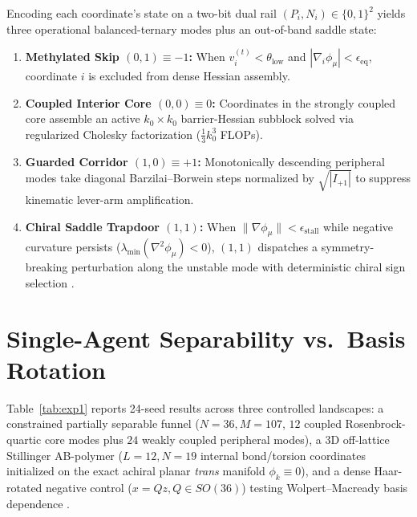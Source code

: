 \documentclass[10pt,twocolumn,letterpaper]{article}
\begin{document}
Encoding each coordinate's state on a two-bit dual rail $(P_i, N_i) \in \{0,1\}^2$ yields three operational balanced-ternary modes plus an out-of-band saddle state:
\begin{enumerate}\setlength{\itemsep}{1pt}\setlength{\parskip}{0pt}
  \item \textbf{Methylated Skip $(0,1) \equiv -1$:} When $v_i^{(t)} < \theta_{\text{low}}$ and $|\nabla_i \phi_\mu| < \epsilon_{\text{eq}}$, coordinate $i$ is excluded from dense Hessian assembly.
  \item \textbf{Coupled Interior Core $(0,0) \equiv 0$:} Coordinates in the strongly coupled core assemble an active $k_0 \times k_0$ barrier-Hessian subblock solved via regularized Cholesky factorization ($\frac{1}{3}k_0^3$ FLOPs).
  \item \textbf{Guarded Corridor $(1,0) \equiv +1$:} Monotonically descending peripheral modes take diagonal Barzilai--Borwein steps normalized by $\sqrt{|I_{+1}|}$ to suppress kinematic lever-arm amplification.
  \item \textbf{Chiral Saddle Trapdoor $(1,1)$:} When $\|\nabla \phi_\mu\| < \epsilon_{\text{stall}}$ while negative curvature persists ($\lambda_{\min}(\nabla^2 \phi_\mu) < 0$), $(1,1)$ dispatches a symmetry-breaking perturbation along the unstable mode with deterministic chiral sign selection \cite{Wu1957}.
\end{enumerate}

\section{Single-Agent Separability vs.\ Basis Rotation}
Table~\ref{tab:exp1} reports 24-seed results across three controlled landscapes: a constrained partially separable funnel ($N=36, M=107$, $12$ coupled Rosenbrock-quartic core modes plus $24$ weakly coupled peripheral modes), a 3D off-lattice Stillinger AB-polymer ($L=12, N=19$ internal bond/torsion coordinates initialized on the exact achiral planar \emph{trans} manifold $\phi_k \equiv 0$), and a dense Haar-rotated negative control ($x = Qz, Q \in SO(36)$) testing Wolpert--Macready basis dependence \cite{Wolpert1997}.
\end{document}

